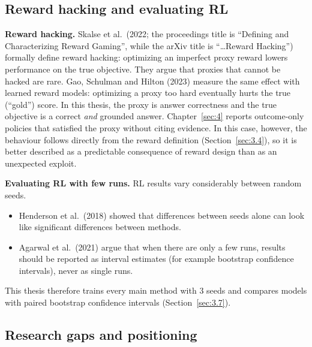 \subsection{Reward hacking and evaluating RL}\label{sec:2.8}

\textbf{Reward hacking.} Skalse et al.~(2022; the proceedings title is
``Defining and Characterizing Reward Gaming'', while the arXiv title is
``\ldots Reward Hacking'') formally define reward hacking: optimizing an
imperfect proxy reward lowers performance on the true objective. They
argue that proxies that cannot be hacked are rare. Gao, Schulman and
Hilton (2023) measure the same effect with learned reward models:
optimizing a proxy too hard eventually hurts the true (``gold'') score.
In this thesis, the proxy is answer correctness and the true objective
is a correct \emph{and} grounded answer. Chapter~\ref{sec:4} reports
outcome-only policies that satisfied the proxy without citing evidence.
In this case, however, the behaviour follows directly from the reward
definition (Section~\ref{sec:3.4}), so it is better described as a
predictable consequence of reward design than as an unexpected exploit.

\textbf{Evaluating RL with few runs.} RL results vary considerably
between random seeds.

\begin{itemize}
\tightlist
\item
  Henderson et al.~(2018) showed that differences between seeds alone
  can look like significant differences between methods.
\item
  Agarwal et al.~(2021) argue that when there are only a few runs,
  results should be reported as interval estimates (for example
  bootstrap confidence intervals), never as single runs.
\end{itemize}

This thesis therefore trains every main method with 3 seeds and compares
models with paired bootstrap confidence intervals
(Section~\ref{sec:3.7}).

\subsection{Research gaps and positioning}\label{sec:2.9}

